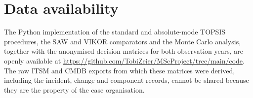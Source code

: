 \documentclass[
  authoryear,
  preprint]{elsarticle}
\begin{document}
\section*{Data availability}\label{data-availability}

The Python implementation of the standard and absolute-mode TOPSIS
procedures, the SAW and VIKOR comparators and the Monte Carlo analysis,
together with the anonymised decision matrices for both observation
years, are openly available at
\url{https://github.com/TobiZeier/MScProject/tree/main/code}. The raw
ITSM and CMDB exports from which these matrices were derived, including
the incident, change and component records, cannot be shared because
they are the property of the case organisation.


\renewcommand\refname{References}

\end{document}
